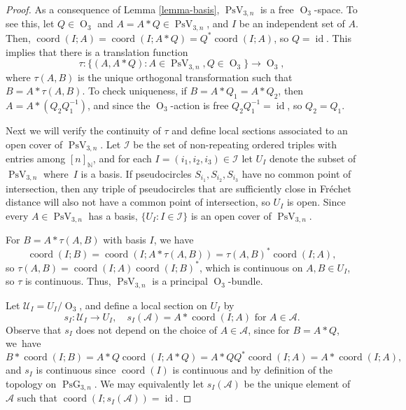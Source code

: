 \documentclass[11pt]{article}
\numberwithin{equation}{section}
\theoremstyle{remark}
\let\mc\mathcal
\let\mb\mathbb
\DeclareMathOperator{\pg}{PsG}
\DeclareMathOperator{\orth}{O}
\DeclareMathOperator{\pstief}{PsV}
\DeclareMathOperator{\coord}{coord}
\DeclareMathOperator{\id}{id}
\begin{document}
\begin{proof}
As a consequence of Lemma \ref{lemma-basis}, $\pstief_{3,n}$ is a free $\orth_3$-space. To see this, let $Q \in \orth_3$ and $A = A*Q \in \pstief_{3,n}$, and $I$ be an independent set of $A$. Then, $\coord(I;A) = \coord(I;A*Q) = Q^* \coord(I;A)$, so $Q = \id$.
This implies that there is a translation function
\[ \tau : \{(A,A*Q): A \in \pstief_{3,n}, Q \in \orth_3 \} \to \orth_3, \]
where $\tau(A,B)$ is the unique orthogonal transformation such that $B = A*\tau(A,B)$.
To check uniqueness, if $B = A*Q_1 = A*Q_2$, then $A = A*(Q_2 Q_1^{-1})$, and since the $\orth_3$-action is free $Q_2 Q_1^{-1} = \id$, so $Q_2=Q_1$.

Next we will verify the continuity of $\tau$ and define local sections associated to an open cover of $\pstief_{3,n}$.
Let $\mc{I}$ be the set of non-repeating ordered triples with entries among $[n]_\mb{N}$, and for each $I = (i_1,i_2,i_3) \in \mc{I}$ let $U_I$ denote the subset of $\pstief_{3,n}$ where~$I$ is a basis.
If pseudocircles $S_{i_1},S_{i_2},S_{i_3}$ have no common point of intersection, then any triple of pseudocircles that are sufficiently close in Fréchet distance will also not have a common point of intersection, so $U_I$ is open. Since every $A \in \pstief_{3,n}$ has a basis, $\{U_I : I \in \mc{I}\}$ is an open cover of $\pstief_{3,n}$.

For $B = A*\tau(A,B)$ with basis $I$, we have
\[
\coord(I;B) = \coord(I;A*\tau(A,B)) = \tau(A,B)^*\coord(I;A),
\]
so $\tau(A,B) = \coord(I;A)\coord(I;B)^*$, which is continuous on $A,B \in U_I$, so $\tau$ is continuous.
Thus, $\pstief_{3,n}$ is a principal $\orth_3$-bundle.

Let $\mc{U}_I = U_I/\orth_3$, and define a local section on $U_I$ by
\[ s_I : \mc{U}_I \to U_I, \quad s_I(\mc{A}) = A *\coord(I;A) \text{ for } A \in \mc{A}. \]
Observe that $s_I$ does not depend on the choice of $A \in \mc{A}$, since for $B = A*Q$, we~have
\[
B *\coord(I;B) = A*Q \coord(I;A*Q) = A*Q Q^* \coord(I;A) = A*\coord(I;A),
\]
and $s_I$ is continuous since $\coord(I)$ is continuous and by definition of the topology on $\pg_{3,n}$.
We may equivalently let $s_I(\mc{A})$ be the unique element of $\mc{A}$ such that $\coord(I;s_I(\mc{A})) = \id$.


\end{proof}
\end{document}
